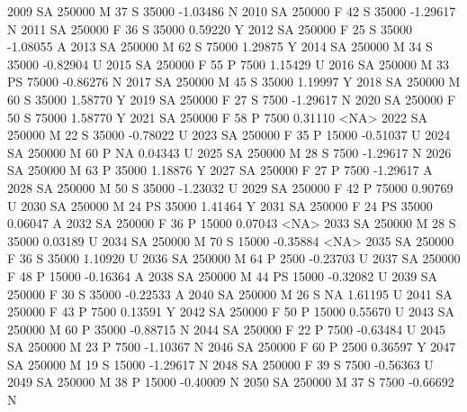 \documentclass{article}
\begin{document}
\begin{Schunk}
\begin{Soutput}
2009     SA     250000   M  37         S  35000  -1.03486    N
2010     SA     250000   F  42         S  35000  -1.29617    N
2011     SA     250000   F  36         S  35000   0.59220    Y
2012     SA     250000   F  25         S  35000  -1.08055    A
2013     SA     250000   M  62         S  75000   1.29875    Y
2014     SA     250000   M  34         S  35000  -0.82904    U
2015     SA     250000   F  55         P   7500   1.15429    U
2016     SA     250000   M  33        PS  75000  -0.86276    N
2017     SA     250000   M  45         S  35000   1.19997    Y
2018     SA     250000   M  60         S  35000   1.58770    Y
2019     SA     250000   F  27         S   7500  -1.29617    N
2020     SA     250000   F  50         S  75000   1.58770    Y
2021     SA     250000   F  58         P   7500   0.31110 <NA>
2022     SA     250000   M  22         S  35000  -0.78022    U
2023     SA     250000   F  35         P  15000  -0.51037    U
2024     SA     250000   M  60         P     NA   0.04343    U
2025     SA     250000   M  28         S   7500  -1.29617    N
2026     SA     250000   M  63         P  35000   1.18876    Y
2027     SA     250000   F  27         P   7500  -1.29617    A
2028     SA     250000   M  50         S  35000  -1.23032    U
2029     SA     250000   F  42         P  75000   0.90769    U
2030     SA     250000   M  24        PS  35000   1.41464    Y
2031     SA     250000   F  24        PS  35000   0.06047    A
2032     SA     250000   F  36         P  15000   0.07043 <NA>
2033     SA     250000   M  28         S  35000   0.03189    U
2034     SA     250000   M  70         S  15000  -0.35884 <NA>
2035     SA     250000   F  36         S  35000   1.10920    U
2036     SA     250000   M  64         P   2500  -0.23703    U
2037     SA     250000   F  48         P  15000  -0.16364    A
2038     SA     250000   M  44        PS  15000  -0.32082    U
2039     SA     250000   F  30         S  35000  -0.22533    A
2040     SA     250000   M  26         S     NA   1.61195    U
2041     SA     250000   F  43         P   7500   0.13591    Y
2042     SA     250000   F  50         P  15000   0.55670    U
2043     SA     250000   M  60         P  35000  -0.88715    N
2044     SA     250000   F  22         P   7500  -0.63484    U
2045     SA     250000   M  23         P   7500  -1.10367    N
2046     SA     250000   F  60         P   2500   0.36597    Y
2047     SA     250000   M  19         S  15000  -1.29617    N
2048     SA     250000   F  39         S   7500  -0.56363    U
2049     SA     250000   M  38         P  15000  -0.40009    N
2050     SA     250000   M  37         S   7500  -0.66692    N

\end{Soutput}
\end{Schunk}
\end{document}
